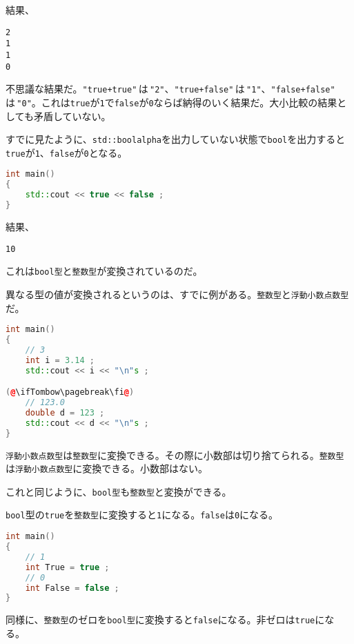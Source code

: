 結果、

\begin{lstlisting}[style=terminal]
2
1
1
0
\end{lstlisting}

不思議な結果だ。\texttt{"true+true"}\,は\,\texttt{"2"}、\texttt{"true+false"}\,は\,\texttt{"1"}、\texttt{"false+false"}\,は\,\texttt{"0"}。これは\texttt{true}が\texttt{1}で\texttt{false}が\texttt{0}ならば納得のいく結果だ。大小比較の結果としても矛盾していない。

すでに見たように、\texttt{std::boolalpha}を出力していない状態で\texttt{bool}を出力すると\texttt{true}が\texttt{1}、\texttt{false}が\texttt{0}となる。

\begin{lstlisting}[language={C++}]
int main()
{
    std::cout << true << false ;
}
\end{lstlisting}

結果、

\begin{lstlisting}[style=terminal]
10
\end{lstlisting}

これは\texttt{bool型}と\texttt{整数型}が変換されているのだ。

異なる型の値が変換されるというのは、すでに例がある。\texttt{整数型}と\texttt{浮動小数点数型}だ。

\begin{lstlisting}[language={C++}]
int main()
{
    // 3
    int i = 3.14 ;
    std::cout << i << "\n"s ;

(@\ifTombow\pagebreak\fi@)
    // 123.0
    double d = 123 ;
    std::cout << d << "\n"s ;
}
\end{lstlisting}

\texttt{浮動小数点数型}は\texttt{整数型}に変換できる。その際に小数部は切り捨てられる。\texttt{整数型}は\texttt{浮動小数点数型}に変換できる。小数部はない。

これと同じように、\texttt{bool型}も\texttt{整数型}と変換ができる。

\texttt{bool}型の\texttt{true}を\texttt{整数型}に変換すると\texttt{1}になる。\texttt{false}は\texttt{0}になる。

\begin{lstlisting}[language={C++}]
int main()
{
    // 1
    int True = true ;
    // 0
    int False = false ;
}
\end{lstlisting}

同様に、\texttt{整数型}のゼロを\texttt{bool型}に変換すると\texttt{false}になる。非ゼロは\texttt{true}になる。

